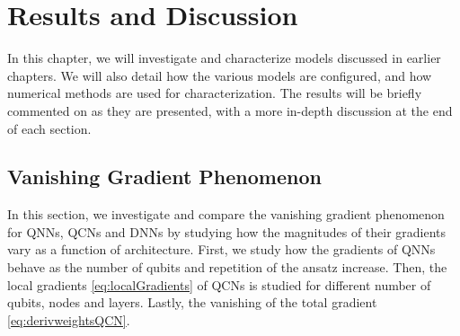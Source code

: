 \chapter{Results and Discussion}\label{chap:results_discussion}
In this chapter, we will investigate and characterize models discussed in earlier chapters. We will also detail how the various models are configured, and how numerical methods are used for characterization. The results will be briefly commented on as they are presented, with a more in-depth discussion at the end of each section.






\section{Vanishing Gradient Phenomenon}\label{sec:Vanishing Gradient Phenomenon}
In this section, we investigate and compare the vanishing gradient phenomenon for QNNs, QCNs and DNNs by studying how the magnitudes of their gradients vary as a function of architecture. First, we study how the gradients of QNNs behave as the number of qubits and repetition of the ansatz increase. Then, the local gradients \autoref{eq:localGradients} of QCNs is studied for different number of qubits, nodes and layers. Lastly, the vanishing of the total gradient \autoref{eq:derivweightsQCN}.


